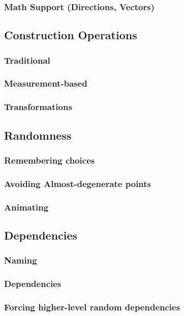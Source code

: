 \documentclass[11pt]{article}
\begin{document}
\subsubsection{Math Support (Directions, Vectors)}
\label{sec-3-1-5}
\subsection{Construction Operations}
\label{sec-3-2}
\subsubsection{Traditional}
\label{sec-3-2-1}
\subsubsection{Measurement-based}
\label{sec-3-2-2}
\subsubsection{Transformations}
\label{sec-3-2-3}
\subsection{Randomness}
\label{sec-3-3}
\subsubsection{Remembering choices}
\label{sec-3-3-1}
\subsubsection{Avoiding Almost-degenerate points}
\label{sec-3-3-2}
\subsubsection{Animating}
\label{sec-3-3-3}
\subsection{Dependencies}
\label{sec-3-4}
\subsubsection{Naming}
\label{sec-3-4-1}
\subsubsection{Dependencies}
\label{sec-3-4-2}
\subsubsection{Forcing higher-level random dependencies}
\label{sec-3-4-3}
\end{document}
